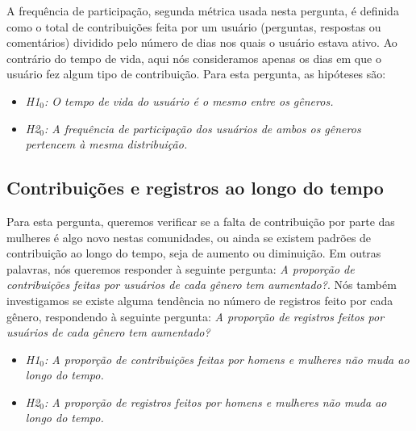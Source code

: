 A frequência de participação, segunda métrica usada nesta pergunta, é definida como o total de contribuições feita por um usuário (perguntas, respostas ou comentários) dividido pelo número de dias nos quais o usuário estava ativo. Ao contrário do tempo de vida, aqui nós consideramos apenas os dias em que o usuário fez algum tipo de contribuição. Para esta pergunta, as hipóteses são:

\begin{itemize}
    \item \textit{H1$_0$: O tempo de vida do usuário é o mesmo entre os gêneros.}
    \item \textit{H2$_0$: A frequência de participação dos usuários de ambos os gêneros pertencem à mesma distribuição.}
\end{itemize}

\subsection{Contribuições e registros ao longo do tempo}

Para esta pergunta, queremos verificar se a falta de contribuição por parte das mulheres é algo novo nestas comunidades, ou ainda se existem padrões de contribuição ao longo do tempo, seja de aumento ou diminuição. Em outras palavras, nós queremos responder à seguinte pergunta: \textit{A proporção de contribuições feitas por usuários de cada gênero tem aumentado?}. Nós também investigamos se existe alguma tendência no número de registros feito por cada gênero, respondendo à seguinte pergunta: \textit{A proporção de registros feitos por usuários de cada gênero tem aumentado?}

\begin{itemize}
    \item \textit{H1$_0$: A proporção de contribuições feitas por homens e mulheres não muda ao longo do tempo.}
    \item \textit{H2$_0$: A proporção de registros feitos por homens e mulheres não muda ao longo do tempo.}
\end{itemize}





